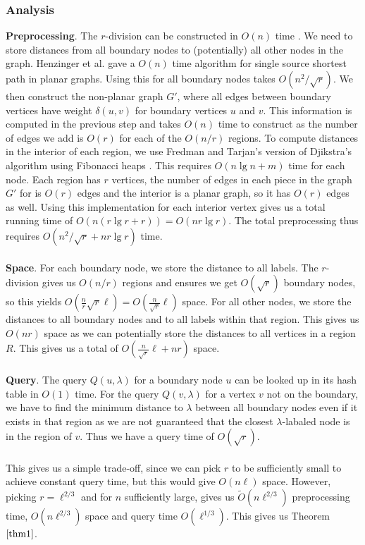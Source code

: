 \subsubsection{Analysis}\label{oracle1analysis}
\textbf{Preprocessing}. The $r$-division can be constructed in $O(n)$ time
\cite{klein2013structured}. We need to store distances from all boundary nodes to (potentially)
all other nodes in the graph. Henzinger et al. \cite{henzinger1997faster} gave a $O(n)$
time algorithm for single source shortest path in planar graphs. Using this for all
boundary nodes takes $O(n^2/\sqrt{r})$. We then construct the non-planar graph $G'$, where all
edges between boundary vertices have weight $\delta(u,v)$ for boundary vertices $u$ and
$v$. This information is computed in the previous step and takes $O(n)$ time to
construct as the number of edges we add is $O(r)$ for each of the $O(n/r)$ regions. To compute distances in the interior of each
region, we use Fredman and Tarjan's version of Djikstra's algorithm using Fibonacci heaps
\cite{fredman1987fibonacci}. This requires $O(n\lg n + m)$ time for each node. Each
region has $r$ vertices, the number of edges in each piece in the graph $G'$ for is $O(r)$ edges and the interior is a planar graph, so it has $O(r)$ edges as well. Using
this implementation for each interior vertex gives us a total running time of $O(n(r\lg r
+ r))=O(nr\lg
r)$. The total preprocessing thus requires $O(n^2/\sqrt{r}+nr\lg r)$ time. \\
\\
\textbf{Space}. For each boundary node, we store the distance to all labels. The $r$-division gives us
$O(n/r)$ regions and ensures we
get $O(\sqrt{r})$ boundary nodes, so this yields
$O(\frac{n}{r}\sqrt{r}\ell)=O(\frac{n}{\sqrt{r}}\ell)$ space. For all other nodes, we
store the distances to all boundary nodes and to all labels within that region. This
gives us $O(nr)$ space as we can potentially store the distances to all vertices in a
region $R$. This gives us a total of $O(\frac{n}{\sqrt{r}}\ell+nr)$ space. \\
\\
\textbf{Query}. The query $Q(u,\lambda)$ for a boundary node $u$ can be looked up in its hash table in
$O(1)$ time. For the query $Q(v,\lambda)$ for a vertex $v$ not on the boundary, we have
to find the minimum distance to $\lambda$ between all boundary nodes even if it exists in
that region as we are not guaranteed that the closest $\lambda$-labaled node is in the
region of $v$. Thus we have a query time of $O(\sqrt{r})$. \\
\\
This gives us a simple trade-off, since we can pick $r$ to be sufficiently small to
achieve constant query time, but this would give $O(n\ell)$ space. However, picking
$r=\ell^{2/3}$ and for $n$ sufficiently large, gives us $\tilde{O}(n\ell^{2/3})$ preprocessing time, $O(n\ell^{2/3})$ space and query time $O(\ell^{1/3})$. This gives us Theorem $\ref{thm1}$.

